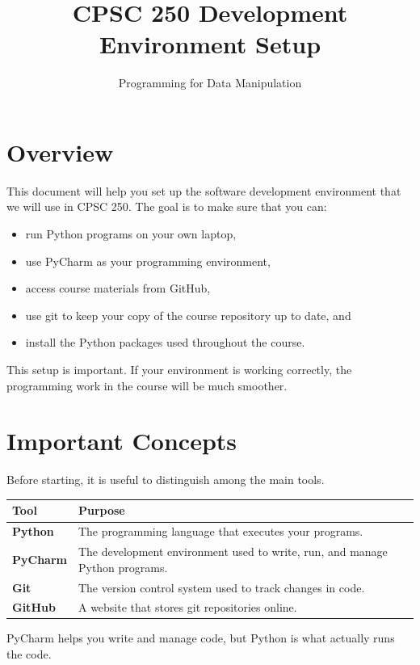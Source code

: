 \documentclass[11pt]{article}
\title{\textbf{CPSC 250 Development Environment Setup}}
\author{Programming for Data Manipulation}
\date{}
\begin{document}
\maketitle

\section*{Overview}

This document will help you set up the software development environment that we will use in CPSC 250. The goal is to make sure that you can:

\begin{itemize}
    \item run Python programs on your own laptop,
    \item use PyCharm as your programming environment,
    \item access course materials from GitHub,
    \item use git to keep your copy of the course repository up to date, and
    \item install the Python packages used throughout the course.
\end{itemize}

This setup is important. If your environment is working correctly, the programming work in the course will be much smoother.

\section*{Important Concepts}

Before starting, it is useful to distinguish among the main tools.

\begin{center}
\begin{tabular}{>{\bfseries}p{1.5in}p{4.6in}}
\toprule
Tool & Purpose \\
\midrule
Python & The programming language that executes your programs. \\
PyCharm & The development environment used to write, run, and manage Python programs. \\
Git & The version control system used to track changes in code. \\
GitHub & A website that stores git repositories online. \\
\bottomrule
\end{tabular}
\end{center}

PyCharm helps you write and manage code, but Python is what actually runs the code.
\end{document}
